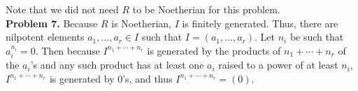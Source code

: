 \documentclass[11pt]{article}
\newcommand{\num}[1]{\noindent \textbf{#1}}
\theoremstyle{definition}
\begin{document}
\noindent Note that we did not need $R$ to be Noetherian for this problem.\\

\num{Problem 7.} Because $R$ is Noetherian, $I$ is finitely generated. Thus,
there are nilpotent elements $a_1,\ldots,a_r\in I$ such that
$I=(a_1,\ldots,a_r)$. Let $n_i$ be such that $a_i^{n_i}=0$. Then because
$I^{n_1+\cdots+n_r}$ is generated by the products of $n_1+\cdots+n_r$ of
the $a_i$'s and any such product has at least one $a_i$ raised to a power
of at least $n_i$, $I^{n_1+\cdots+n_r}$ is generated by 0's, and thus
$I^{n_1+\cdots+n_r}=(0)$.
\end{document}
